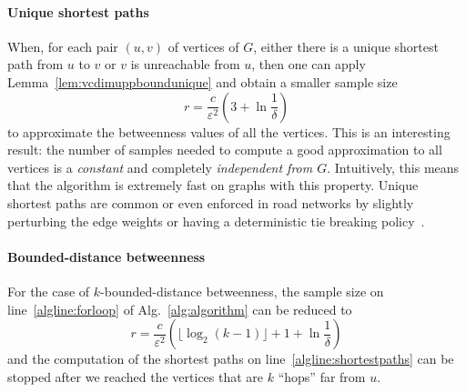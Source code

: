 \paragraph{Unique shortest paths} 
When, for each pair $(u,v)$ of vertices of $G$, either there is a unique
shortest path from $u$ to $v$ or $v$ is unreachable from $u$, 
 then one can apply Lemma~\ref{lem:vcdimuppboundunique} and obtain a smaller
sample size
\[
  r= \frac{c}{\varepsilon^2}\left(3+\ln\frac{1}{\delta}\right)
\]
to approximate the betweenness values of all the vertices. 
This is an interesting result: the number of samples needed to compute a good
approximation to all vertices is a \emph{constant} and completely
\emph{independent from $G$}. Intuitively, this means that the algorithm is
extremely fast on graphs with this property. Unique shortest paths are common or
even enforced in road networks by slightly perturbing the edge weights or having
a deterministic tie breaking policy~\citep{GeisbergerSS08}.

\paragraph{Bounded-distance betweenness} For the case of
$k$-bounded-distance betweenness, the sample size on line~\ref{algline:forloop}
of Alg.~\ref{alg:algorithm} can be reduced to 
\[ 
  r= \frac{c}{\varepsilon^2}\left(\lfloor\log_2(k-1)\rfloor + 1 +\ln\frac{1}{\delta}\right)
\]
and the computation of the shortest paths on line~\ref{algline:shortestpaths}
can be stopped after we reached the vertices that are $k$ ``hops'' far from $u$.


